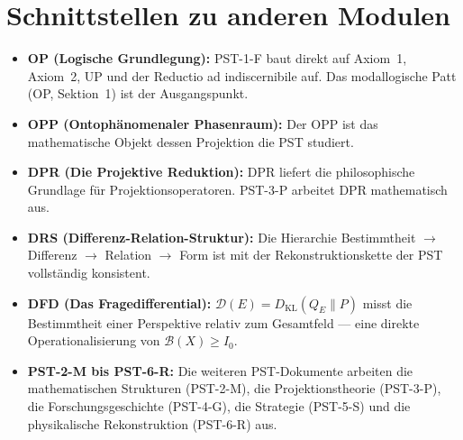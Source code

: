 \documentclass[11pt,a4paper]{article}
\theoremstyle{plain}
\theoremstyle{definition}
\begin{document}
\section{Schnittstellen zu anderen Modulen}

\begin{itemize}
  \item \textbf{OP (Logische Grundlegung):} PST-1-F baut direkt auf
        Axiom~1, Axiom~2, UP und der Reductio ad indiscernibile auf.
        Das modallogische Patt (OP, Sektion~1) ist der Ausgangspunkt.
  \item \textbf{OPP (Ontoph\"{a}nomenaler Phasenraum):} Der OPP ist das
        mathematische Objekt dessen Projektion die PST studiert.
  \item \textbf{DPR (Die Projektive Reduktion):} DPR liefert die
        philosophische Grundlage f\"{u}r Projektionsoperatoren.
        PST-3-P arbeitet DPR mathematisch aus.
  \item \textbf{DRS (Differenz-Relation-Struktur):} Die Hierarchie
        Bestimmtheit $\rightarrow$ Differenz $\rightarrow$ Relation
        $\rightarrow$ Form ist mit der Rekonstruktionskette der PST
        vollst\"{a}ndig konsistent.
  \item \textbf{DFD (Das Fragedifferential):} $\mathcal{D}(E) =
        D_{\text{KL}}(Q_E \| P)$ misst die Bestimmtheit einer Perspektive
        relativ zum Gesamtfeld --- eine direkte Operationalisierung von
        $\mathcal{B}(X) \geq I_0$.
  \item \textbf{PST-2-M bis PST-6-R:} Die weiteren PST-Dokumente
        arbeiten die mathematischen Strukturen (PST-2-M), die
        Projektionstheorie (PST-3-P), die Forschungsgeschichte (PST-4-G),
        die Strategie (PST-5-S) und die physikalische Rekonstruktion
        (PST-6-R) aus.
\end{itemize}
\end{document}
